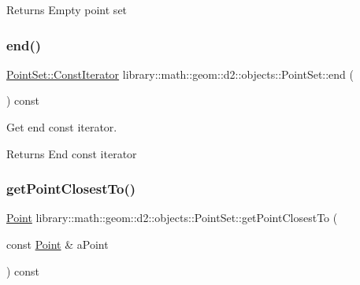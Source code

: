 \begin{DoxyReturn}{Returns}
Empty point set 
\end{DoxyReturn}
\mbox{\label{classlibrary_1_1math_1_1geom_1_1d2_1_1objects_1_1_point_set_a7ae46d64848d5dda85ea621bb0f24ef7}} 
\subsubsection{\texorpdfstring{end()}{end()}}
{\footnotesize\ttfamily \hyperlink{classlibrary_1_1math_1_1geom_1_1d2_1_1objects_1_1_point_set_ad4c4f52fdc966f0d2031402edefc9e98}{Point\+Set\+::\+Const\+Iterator} library\+::math\+::geom\+::d2\+::objects\+::\+Point\+Set\+::end (\begin{DoxyParamCaption}{ }\end{DoxyParamCaption}) const}



Get end const iterator. 

\begin{DoxyReturn}{Returns}
End const iterator 
\end{DoxyReturn}
\mbox{\label{classlibrary_1_1math_1_1geom_1_1d2_1_1objects_1_1_point_set_a4d4944b034ead53d1b734fe74cd1bc60}} 
\subsubsection{\texorpdfstring{get\+Point\+Closest\+To()}{getPointClosestTo()}}
{\footnotesize\ttfamily \hyperlink{classlibrary_1_1math_1_1geom_1_1d2_1_1objects_1_1_point}{Point} library\+::math\+::geom\+::d2\+::objects\+::\+Point\+Set\+::get\+Point\+Closest\+To (\begin{DoxyParamCaption}\item[{const \hyperlink{classlibrary_1_1math_1_1geom_1_1d2_1_1objects_1_1_point}{Point} \&}]{a\+Point }\end{DoxyParamCaption}) const}



